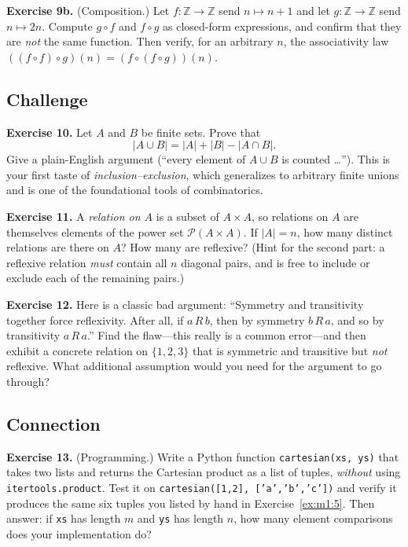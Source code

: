 \documentclass[11pt]{article}
\begin{document}
\bigskip
\noindent\textbf{Exercise 9b.}\label{ex:m1:9b} (Composition.) Let $f : \mathbb{Z} \to \mathbb{Z}$ send $n \mapsto n+1$ and let $g : \mathbb{Z} \to \mathbb{Z}$ send $n \mapsto 2n$. Compute $g \circ f$ and $f \circ g$ as closed-form expressions, and confirm that they are \emph{not} the same function. Then verify, for an arbitrary $n$, the associativity law $((f \circ f) \circ g)(n) = (f \circ (f \circ g))(n)$.

\subsection*{Challenge}

\textbf{Exercise 10.}\label{ex:m1:10} Let $A$ and $B$ be finite sets. Prove that
\[
  |A \cup B| = |A| + |B| - |A \cap B|.
\]
Give a plain-English argument (``every element of $A \cup B$ is counted \ldots''). This is your first taste of \emph{inclusion--exclusion}, which generalizes to arbitrary finite unions and is one of the foundational tools of combinatorics.

\bigskip
\noindent\textbf{Exercise 11.}\label{ex:m1:11} A \emph{relation on $A$} is a subset of $A \times A$, so relations on $A$ are themselves elements of the power set $\mathcal{P}(A \times A)$. If $|A| = n$, how many distinct relations are there on $A$? How many are reflexive? (Hint for the second part: a reflexive relation \emph{must} contain all $n$ diagonal pairs, and is free to include or exclude each of the remaining pairs.)

\bigskip
\noindent\textbf{Exercise 12.}\label{ex:m1:12} Here is a classic bad argument: ``Symmetry and transitivity together force reflexivity. After all, if $a\, R\, b$, then by symmetry $b\, R\, a$, and so by transitivity $a\, R\, a$.'' Find the flaw---this really is a common error---and then exhibit a concrete relation on $\{1, 2, 3\}$ that is symmetric and transitive but \emph{not} reflexive. What additional assumption would you need for the argument to go through?

\subsection*{Connection}

\textbf{Exercise 13.}\label{ex:m1:13} (Programming.) Write a Python function \texttt{cartesian(xs, ys)} that takes two lists and returns the Cartesian product as a list of tuples, \emph{without} using \texttt{itertools.product}. Test it on \texttt{cartesian([1,2],\ ['a','b','c'])} and verify it produces the same six tuples you listed by hand in Exercise~\ref{ex:m1:5}. Then answer: if \texttt{xs} has length $m$ and \texttt{ys} has length $n$, how many element comparisons does your implementation do?
\end{document}
